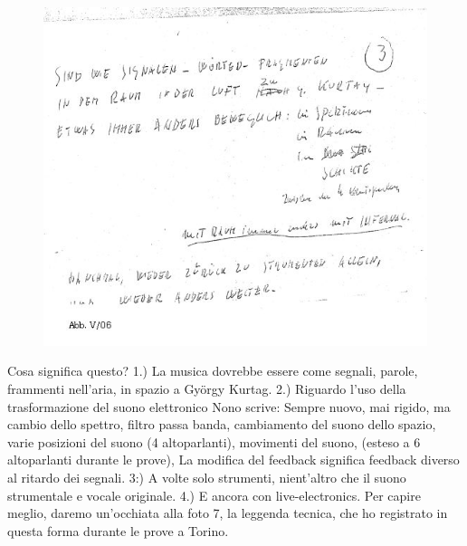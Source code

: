 \begin{figure}[htbp]
\begin{center}
\includegraphics[width=1\textwidth]{images/nono/hph/ab_v_06.jpg}
\caption{}
\label{hph-img6}
\end{center}
\end{figure}

Cosa significa questo?
1.) La musica dovrebbe essere come segnali, parole, frammenti nell'aria, in
spazio a György Kurtag.
2.) Riguardo l'uso della trasformazione del suono elettronico Nono scrive:
Sempre nuovo, mai rigido, ma
cambio dello spettro, filtro passa banda,
cambiamento del suono dello spazio, varie posizioni del suono (4 altoparlanti), movimenti del suono, (esteso a 6 altoparlanti durante le prove),
La modifica del feedback significa feedback diverso al ritardo dei segnali.
3:) A volte solo strumenti, nient'altro che il suono strumentale e vocale originale.
4.) E ancora con live-electronics.
Per capire meglio, daremo un'occhiata alla foto 7, la leggenda tecnica, che ho registrato in questa forma durante le prove a Torino.

